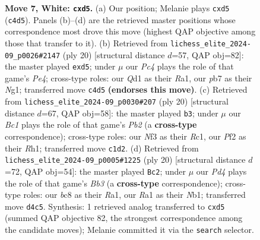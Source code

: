 \documentclass[11pt]{article}
\begin{document}
\begin{figure}[p]
\caption{\textbf{Move 7, White: \texttt{cxd5}.} (a) Our position; Melanie plays \texttt{cxd5} (\texttt{c4d5}). Panels (b)--(d) are the retrieved master positions whose correspondence most drove this move (highest QAP objective among those that transfer to it). (b) Retrieved from \texttt{lichess\_elite\_2024-09\_p0026\#2147} (ply 20) [structural distance $d$=57, QAP obj=82]: the master played \texttt{exd5}; under $\mu$ our \emph{Pc4} plays the role of that game's \emph{Pe4}; cross-type roles: our \emph{Q}d1 as their \emph{R}a1, our \emph{p}b7 as their \emph{N}g1; transferred move \texttt{c4d5} \textbf{(endorses this move)}. (c) Retrieved from \texttt{lichess\_elite\_2024-09\_p0030\#207} (ply 20) [structural distance $d$=67, QAP obj=58]: the master played \texttt{b3}; under $\mu$ our \emph{Bc1} plays the role of that game's \emph{Pb2} (a \textbf{cross-type} correspondence); cross-type roles: our \emph{N}f3 as their \emph{R}c1, our \emph{P}f2 as their \emph{R}h1; transferred move \texttt{c1d2}. (d) Retrieved from \texttt{lichess\_elite\_2024-09\_p0005\#1225} (ply 20) [structural distance $d$=72, QAP obj=54]: the master played \texttt{Bc2}; under $\mu$ our \emph{Pd4} plays the role of that game's \emph{Bb3} (a \textbf{cross-type} correspondence); cross-type roles: our \emph{b}c8 as their \emph{R}a1, our \emph{R}a1 as their \emph{N}b1; transferred move \texttt{d4c5}. Synthesis: 1 retrieved analog transferred to \texttt{cxd5} (summed QAP objective 82, the strongest correspondence among the candidate moves); Melanie committed it via the \texttt{search} selector.}
\label{fig:thought-m12}
\end{figure}

\clearpage
\end{document}
